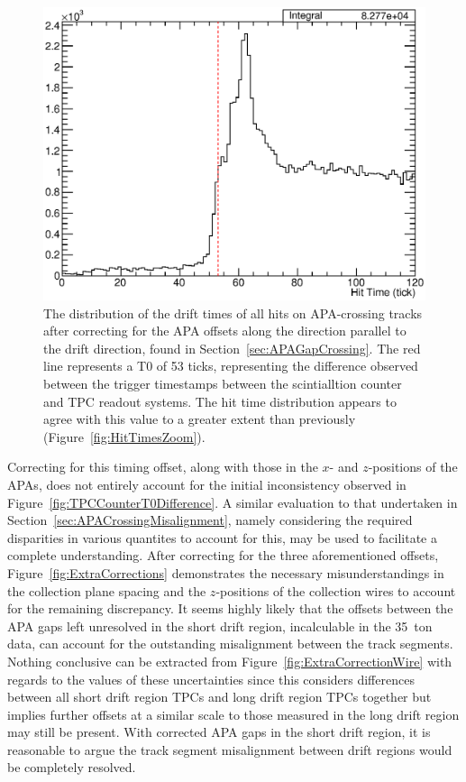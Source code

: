 \begin{figure}
  \centering
  \includegraphics[width=12cm]{HitTimesFixed.eps}
  \caption[The distribution of the drift times of all hits on APA-crossing tracks after correcting for the APA offsets along the direction parallel to the drift direction.]{The distribution of the drift times of all hits on APA-crossing tracks after correcting for the APA offsets along the direction parallel to the drift direction, found in Section~\ref{sec:APAGapCrossing}.  The red line represents a T0 of 53 ticks, representing the difference observed between the trigger timestamps between the scintialltion counter and TPC readout systems.  The hit time distribution appears to agree with this value to a greater extent than previously (Figure~\ref{fig:HitTimesZoom}).}
  \label{fig:HitTimesFixed}
\end{figure}

Correcting for this timing offset, along with those in the $x$- and $z$-positions of the APAs, does not entirely account for the initial inconsistency observed in Figure~\ref{fig:TPCCounterT0Difference}.  A similar evaluation to that undertaken in Section~\ref{sec:APACrossingMisalignment}, namely considering the required disparities in various quantites to account for this, may be used to facilitate a complete understanding.  After correcting for the three aforementioned offsets, Figure~\ref{fig:ExtraCorrections} demonstrates the necessary misunderstandings in the collection plane spacing and the $z$-positions of the collection wires to account for the remaining discrepancy.  It seems highly likely that the offsets between the APA gaps left unresolved in the short drift region, incalculable in the 35~ton data, can account for the outstanding misalignment between the track segments.  Nothing conclusive can be extracted from Figure~\ref{fig:ExtraCorrectionWire} with regards to the values of these uncertainties since this considers differences between all short drift region TPCs and long drift region TPCs together but implies further offsets at a similar scale to those measured in the long drift region may still be present.  With corrected APA gaps in the short drift region, it is reasonable to argue the track segment misalignment between drift regions would be completely resolved.

